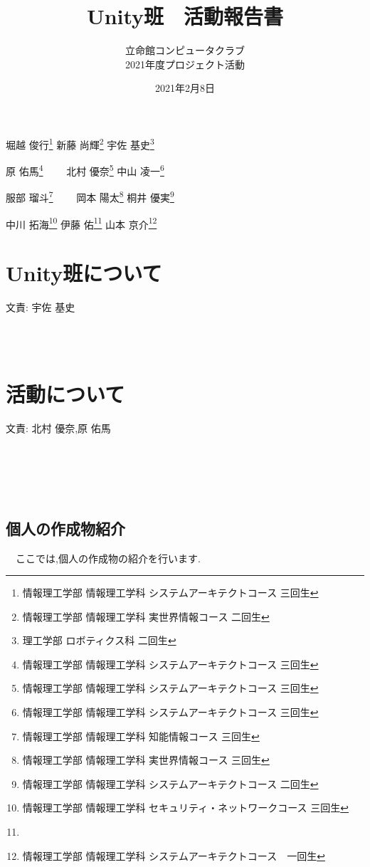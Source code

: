 \documentclass[a4paper]{jarticle}
\title{Unity班　活動報告書}
\author{立命館コンピュータクラブ\\2021年度プロジェクト活動}
\date{2021年2月8日}
\newcommand{\resp}[1]{\begin{flushright}文責: #1\end{flushright}~\\　}
\begin{document}
  \maketitle
  \begin{center}
    堀越 俊行\footnote{情報理工学部 情報理工学科 システムアーキテクトコース 三回生}
        新藤 尚輝\footnote{情報理工学部 情報理工学科 実世界情報コース 二回生}
        宇佐 基史\footnote{理工学部 ロボティクス科 二回生}

    原 佑馬\footnote{情報理工学部 情報理工学科 システムアーキテクトコース 三回生}
    　　北村 優奈\footnote{情報理工学部 情報理工学科 システムアーキテクトコース 三回生}
        中山 凌一\footnote{情報理工学部 情報理工学科 システムアーキテクトコース 三回生}

    服部 瑠斗\footnote{情報理工学部 情報理工学科 知能情報コース 三回生}
    　　岡本 陽太\footnote{情報理工学部 情報理工学科 実世界情報コース 三回生}
        桐井 優実\footnote{情報理工学部 情報理工学科 システムアーキテクトコース 二回生}

    中川 拓海\footnote{情報理工学部 情報理工学科 セキュリティ・ネットワークコース 三回生}
        伊藤 佑\footnote{}
        山本 京介\footnote{情報理工学部 情報理工学科 システムアーキテクトコース　一回生}

  \end{center}

  \newpage

  \tableofcontents

  \newpage

  \section{Unity班について}
    \resp{宇佐 基史}
    
  \section{活動について}
    \resp{北村 優奈,原 佑馬}

　\subsection{個人の作成物紹介}
  　ここでは,個人の作成物の紹介を行います.
\end{document}
